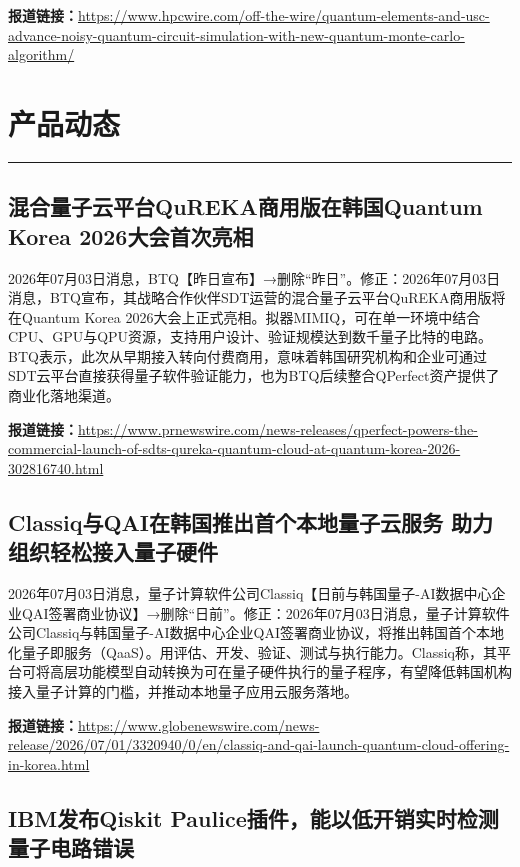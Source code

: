 \documentclass[12pt,a4paper]{ctexart}
\begin{document}
\noindent\textbf{报道链接：}\url{https://www.hpcwire.com/off-the-wire/quantum-elements-and-usc-advance-noisy-quantum-circuit-simulation-with-new-quantum-monte-carlo-algorithm/}


\newpage
\section{产品动态}
\vspace{-0.5em}
\noindent\rule{\linewidth}{1.5pt}

\subsection{ 混合量子云平台QuREKA商用版在韩国Quantum Korea 2026大会首次亮相 }

2026年07月03日消息，BTQ【昨日宣布】→删除“昨日”。修正：2026年07月03日消息，BTQ宣布，其战略合作伙伴SDT运营的混合量子云平台QuREKA商用版将在Quantum Korea 2026大会上正式亮相。拟器MIMIQ，可在单一环境中结合CPU、GPU与QPU资源，支持用户设计、验证规模达到数千量子比特的电路。BTQ表示，此次从早期接入转向付费商用，意味着韩国研究机构和企业可通过SDT云平台直接获得量子软件验证能力，也为BTQ后续整合QPerfect资产提供了商业化落地渠道。

\noindent\textbf{报道链接：}\url{https://www.prnewswire.com/news-releases/qperfect-powers-the-commercial-launch-of-sdts-qureka-quantum-cloud-at-quantum-korea-2026-302816740.html}

\subsection{ Classiq与QAI在韩国推出首个本地量子云服务 助力组织轻松接入量子硬件 }

2026年07月03日消息，量子计算软件公司Classiq【日前与韩国量子-AI数据中心企业QAI签署商业协议】→删除“日前”。修正：2026年07月03日消息，量子计算软件公司Classiq与韩国量子-AI数据中心企业QAI签署商业协议，将推出韩国首个本地化量子即服务（QaaS）。用评估、开发、验证、测试与执行能力。Classiq称，其平台可将高层功能模型自动转换为可在量子硬件执行的量子程序，有望降低韩国机构接入量子计算的门槛，并推动本地量子应用云服务落地。

\noindent\textbf{报道链接：}\url{https://www.globenewswire.com/news-release/2026/07/01/3320940/0/en/classiq-and-qai-launch-quantum-cloud-offering-in-korea.html}

\subsection{ IBM发布Qiskit Paulice插件，能以低开销实时检测量子电路错误 }
\end{document}
